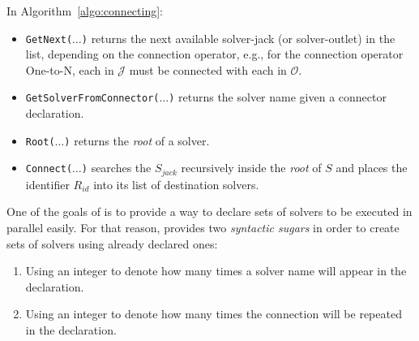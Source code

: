 In Algorithm~\ref{algo:connecting}:
\begin{itemize}
\item \texttt{GetNext($\dots$)} returns the next available solver-jack (or solver-outlet) in the list, depending on the connection operator, e.g., for the connection operator One-to-N, each \jack{} in $\mathcal{J}$ must be connected with each \outlet{} in $\mathcal{O}$.
\item \texttt{GetSolverFromConnector($\dots$)} returns the solver name given a connector declaration.
\item \texttt{Root($\dots$)} returns the {\it root} \cm{} of a solver.
\item \texttt{Connect($\dots$)} %
searches the \om{} $S_{jack}$ recursively inside the {\it root} \cm{} of $S$ and places the identifier $R_{id}$ into its list of destination solvers.
\end{itemize}


\separation

One of the goals of \posl{} is to provide a way to declare sets of solvers to be executed in parallel easily. For that reason, \posl{} provides two \textit{syntactic sugars} %
in order to create sets of solvers using already declared ones:
\begin{enumerate}
\item Using an integer to denote how many times a solver name will appear in the declaration.
\item Using an integer to denote how many times the connection will be repeated in the declaration.
\end{enumerate}

